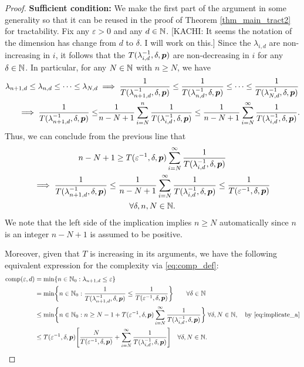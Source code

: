\documentclass[sort&compress]{elsarticle}
\newcommand{\thed}{\delta}
\newcommand{\kachi}[1]{\begingroup\color{ForestGreen}#1\endgroup}
\begin{document}
\begin{proof}
\textbf{Sufficient condition:}\newline
We make the first part of the argument in some generality so that it can be reused in the proof of Theorem \ref{thm_main_tract2} for tractability.  Fix any $\varepsilon > 0$ and any $d \in \mathbb{N}$.
\kachi{[KACHI: It seems the notation of the dimension has change from $d$ to $\delta$. I will work on this.]}
Since the $\lambda_{i,d}$ are non-increasing in $i$, it follows that the $T(\lambda_{i,d}^{-1},\thed,\vp)$ are non-decreasing in $i$ for any $\thed\in\naturals$. In particular, for  any $N\in\mathbb{N}$ with $n\ge N$, we have
\begin{align*}
    \lambda_{n+1,d} \le \lambda_{n,d} \le \cdots \le \lambda_{N,d}
    & \implies \frac{1}{T(\lambda_{n+1, d}^{-1},\thed,\vp)} \le \frac{1}{T(\lambda_{n, d}^{-1},\thed,\vp)} \le \cdots \le \frac{1}{T(\lambda_{N, d}^{-1},\thed,\vp)} \\
     \implies \frac{1}{T(\lambda_{n+1, d}^{-1},\thed,\vp) }
    \le &\frac{1}{n-N+1} \sum_{i=N}^n  \frac{1}{T(\lambda_{i, d}^{-1},\thed,\vp) }
    \le \frac{1}{n-N+1} \sum_{i=N}^\infty  \frac{1}{T(\lambda_{i, d}^{-1},\thed,\vp)}.
\end{align*}
Thus, we can conclude from the previous line that
\begin{multline} \label{eq:implicate_a}
    n - N +1 \ge T(\varepsilon^{-1},\thed,\vp) \sum_{i=N}^\infty \frac{1}{T(\lambda_{i, d}^{-1},\thed,\vp)} \\
   \implies   \frac{1}{T(\lambda_{n+1, d}^{-1},\thed,\vp)} \le
   \frac{1}{n-N+1} \sum_{i=N}^\infty \frac{1}{T(\lambda_{i, d}^{-1},\thed,\vp) } \le \frac{1}{T(\varepsilon^{-1},\thed,\vp)} \\ \forall \thed, n, N \in \naturals.
\end{multline}
We note that the left side of the implication implies $n \ge N$ automatically since $n$ is an integer  $n - N +1$ is assumed to be positive.

Moreover, given that $T$ is increasing in its arguments, we have the following equivalent expression for the complexity via \eqref{eq:comp_def}:
\begin{align} %
	\nonumber
	\comp(\varepsilon, d) & = \min \{n \in \natzero : \lambda_{n+1, d} \le \varepsilon\} \\
	\nonumber
	& = \min \biggl\{n \in \natzero : \frac{1}{T(\lambda_{n+1,d}^{-1},\thed,\vp)}\le \frac{1}{T(\varepsilon^{-1},\thed,\vp) }\biggr\} \qquad  \forall \thed\in \naturals\\
	\nonumber
	& \le  \min \biggl\{n \in \natzero : n \ge N - 1 + T(\varepsilon^{-1},\thed,\vp) \sum_{i=N}^\infty \frac{1}{T(\lambda_{i, d}^{-1},\thed,\vp)} \biggr\} \;  \forall  \thed, N \in \naturals, \quad \text{by \eqref{eq:implicate_a}} \\ 
	& \le  T(\varepsilon^{-1},\thed,\vp) \Biggl [\frac{N}{T(\varepsilon^{-1},\thed,\vp)}  +  \sum_{i=N}^\infty \frac{1}{T(\lambda_{i, d}^{-1},\thed,\vp)} \Biggr] \quad \forall  \thed, N \in \naturals. \label{eq:compUP}
\end{align}


\end{proof}
\end{document}
